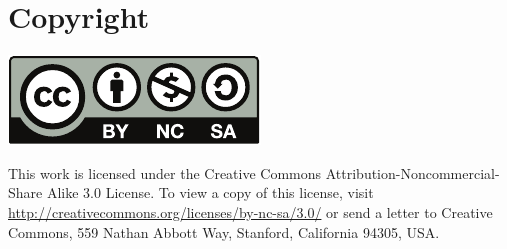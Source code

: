 \section*{Copyright}
\begin{center}
 \includegraphics[scale=0.5]{img/by-nc-sa}
\end{center}
This work is licensed under the Creative Commons Attribution-Noncommercial-Share
Alike 3.0 License. To view a copy of this license, visit
\url{http://creativecommons.org/licenses/by-nc-sa/3.0/} or send a letter to
Creative Commons, 559 Nathan Abbott Way, Stanford, California 94305, USA.
